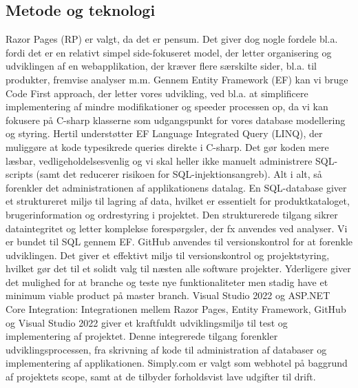 \subsection{Metode og teknologi}
\label{sec:metode-teknologi}
Razor Pages (RP) er valgt, da det er pensum. 
Det giver dog nogle fordele bl.a. fordi det er en relativt simpel side-fokuseret model, der letter organisering og udviklingen af en webapplikation, der kræver flere særskilte sider, bl.a. til produkter, fremvise analyser m.m. 
Gennem Entity Framework (EF) kan vi bruge Code First approach, der letter vores udvikling, ved bl.a. at simplificere implementering af mindre modifikationer og speeder processen op, 
da vi kan fokusere på C-sharp klasserne som udgangspunkt for vores database modellering og styring. Hertil understøtter EF Language Integrated Query (LINQ), der muliggøre at kode typesikrede queries direkte i C-sharp. 
Det gør koden mere læsbar, vedligeholdelsesvenlig og vi skal heller ikke manuelt administrere SQL-scripts (samt det reducerer risikoen for SQL-injektionsangreb). 
Alt i alt, så forenkler det administrationen af applikationens datalag. En SQL-database giver et struktureret miljø til lagring af data, hvilket er essentielt for produktkataloget, brugerinformation og ordrestyring i projektet. 
Den strukturerede tilgang sikrer dataintegritet og letter komplekse forespørgsler, der fx anvendes ved analyser. Vi er bundet til SQL gennem EF.
GitHub anvendes til versionskontrol for at forenkle udviklingen. Det giver et effektivt miljø til versionskontrol og projektstyring, hvilket gør det til et solidt valg til næsten alle software projekter. 
Yderligere giver det mulighed for at branche og teste nye funktionaliteter men stadig have et minimum viable product på master branch. 
Visual Studio 2022 og ASP.NET Core Integration: Integrationen mellem Razor Pages, Entity Framework, GitHub og Visual Studio 2022 giver et kraftfuldt udviklingsmiljø til test og implementering af projektet. 
Denne integrerede tilgang forenkler udviklingsprocessen, fra skrivning af kode til administration af databaser og implementering af applikationen.
Simply.com er valgt som webhotel på baggrund af projektets scope, samt at de tilbyder forholdsvist lave udgifter til drift.